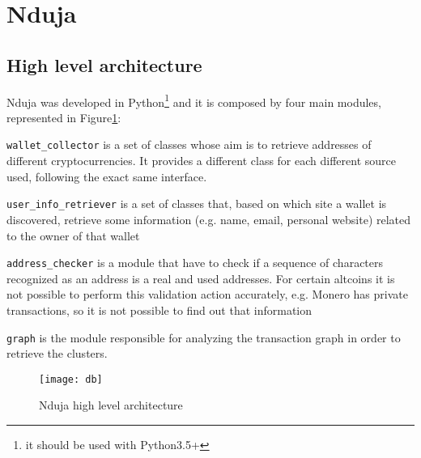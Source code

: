 \newcommand{\walletcollector}{\texttt{wallet\_collector}}
\newcommand{\userinforetriever}{\texttt{user\_info\_retriever}}
\newcommand{\addresschecker}{\texttt{address\_checker}}
\newcommand{\graph}{\texttt{graph}}

\section{Nduja} \label{nduja}
\subsection{High level architecture}
Nduja was developed in Python\footnote{it should be used with Python3.5+} and it
is composed by four main modules, represented in Figure\ref{fig:architecture}:
\begin{enumerate*}[label=\roman*),itemjoin={,\quad}]
\item \walletcollector{} is a set of classes whose aim is to retrieve
addresses of different cryptocurrencies. It provides a different class for each
different source used, following the exact same interface.
\item \userinforetriever{} is a set of classes that, based on which
site a wallet is discovered, retrieve some information (e.g. name, email,
personal website) related to the owner of that wallet
\item \addresschecker{} is a module that have to check if a sequence of
characters recognized as an address is a real and used addresses. For certain
altcoins it is not possible to perform this validation action accurately, e.g.
Monero has private transactions, so it is not possible to find out that
information
\item \graph{} is the module responsible for analyzing the transaction graph
in order to retrieve the clusters.
\end{enumerate*}

\begin{figure}[t]
\centering
\texttt{[image: db]}
\caption{Nduja high level architecture}
\label{fig:architecture}
\end{figure}

